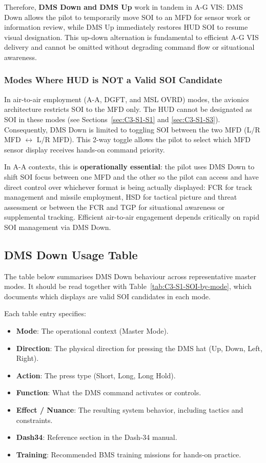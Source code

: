 \documentclass[11pt, a4paper, twoside]{report}
\begin{document}
Therefore, \textbf{DMS Down and DMS Up} work in tandem in A-G VIS: DMS Down allows the pilot to temporarily move SOI to an MFD for sensor work or information review, while DMS Up immediately restores HUD SOI to resume visual designation. This up-down alternation is fundamental to efficient A-G VIS delivery and cannot be omitted without degrading command flow or situational awareness.

\subsubsection{Modes Where HUD is NOT a Valid SOI Candidate}
\label{sec:C3-S3-S1-S2}

In air-to-air employment (A-A, DGFT, and MSL OVRD) modes, the avionics architecture restricts SOI to the MFD only. The HUD cannot be designated as SOI 
in these modes (see Sections~\ref{sec:C3-S1-S1} and \ref{sec:C3-S1-S3}). Consequently, DMS Down is limited to toggling SOI between the two MFD (L/R MFD $\leftrightarrow$ L/R MFD). This 2-way toggle allows the pilot to select which MFD sensor display receives hands-on command priority.

In A-A contexts, this is \textbf{operationally essential}: the pilot uses DMS Down to shift SOI focus between one MFD and the other so the pilot can access and have direct control over whichever format is being actually displayed: FCR for track management and missile employment, HSD for tactical picture and threat assessment or between the FCR and TGP for situational awareness or supplemental tracking. Efficient air-to-air engagement depends critically on rapid SOI management via DMS Down.

\subsection{DMS Down Usage Table}
\label{sec:C3-S3-S2}

The table below summarises DMS Down behaviour across representative master modes. It should be read together with Table~\ref{tab:C3-S1-SOI-by-mode}, which documents which displays are valid SOI candidates in each mode.

Each table entry specifies:

\begin{itemize}
	\item \textbf{Mode}: The operational context (Master Mode).
	\item \textbf{Direction}: The physical direction for pressing the DMS hat (Up, Down, Left, Right).
	\item \textbf{Action}: The press type (Short, Long, Long Hold).
	\item \textbf{Function}: What the DMS command activates or controls.
	\item \textbf{Effect / Nuance}: The resulting system behavior, including tactics and constraints.
	\item \textbf{Dash34}: Reference section in the Dash-34 manual.
	\item \textbf{Training}: Recommended BMS training missions for hands-on practice.
\end{itemize}
\end{document}
